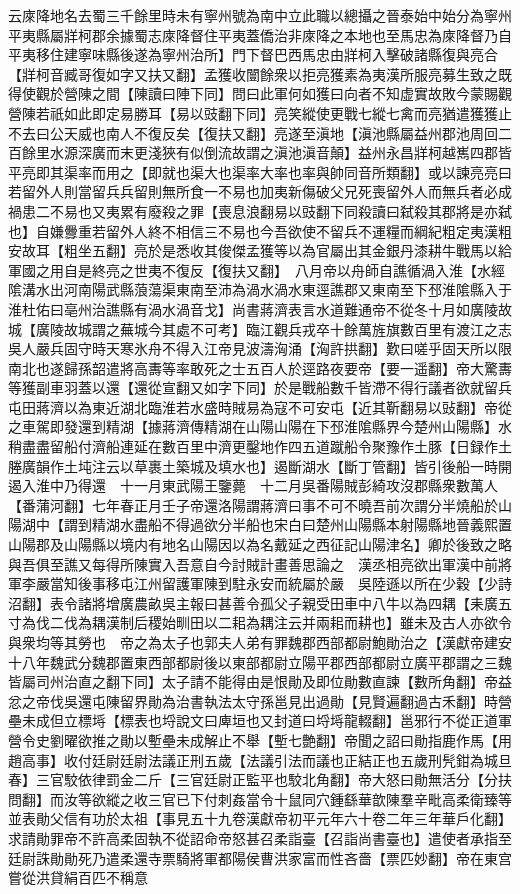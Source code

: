 云庲降地名去蜀三千餘里時未有寧州號為南中立此職以總攝之晉泰始中始分為寧州平夷縣屬牂柯郡余據蜀志庲降督住平夷蓋僑治非庲降之本地也至馬忠為庲降督乃自平夷移住建寧味縣後遂為寧州治所】門下督巴西馬忠由牂柯入擊破諸縣復與亮合【牂柯音臧哥復如字又扶又翻】孟獲收闓餘衆以拒亮獲素為夷漢所服亮募生致之既得使觀於營陳之間【陳讀曰陣下同】問曰此軍何如獲曰向者不知虚實故敗今蒙賜觀營陳若祇如此即定易勝耳【易以豉翻下同】亮笑縱使更戰七縱七禽而亮猶遣獲獲止不去曰公天威也南人不復反矣【復扶又翻】亮遂至滇地【滇池縣屬益州郡池周回二百餘里水源深廣而末更淺狹有似倒流故謂之滇池滇音顛】益州永昌牂柯越嶲四郡皆平亮即其渠率而用之【即就也渠大也渠率大率也率與帥同音所類翻】或以諫亮亮曰若留外人則當留兵兵留則無所食一不易也加夷新傷破父兄死喪留外人而無兵者必成禍患二不易也又夷累有廢殺之罪【喪息浪翻易以豉翻下同殺讀曰弑殺其郡將是亦弑也】自嫌釁重若留外人終不相信三不易也今吾欲使不留兵不運糧而綱紀粗定夷漢粗安故耳【粗坐五翻】亮於是悉收其俊傑孟獲等以為官屬出其金銀丹漆耕牛戰馬以給軍國之用自是終亮之世夷不復反【復扶又翻】　八月帝以舟師自譙循渦入淮【水經隂溝水出河南陽武縣蒗蕩渠東南至沛為渦水渦水東逕譙郡又東南至下邳淮隂縣入于淮杜佑曰亳州治譙縣有渦水渦音戈】尚書蔣濟表言水道難通帝不從冬十月如廣陵故城【廣陵故城謂之蕪城今其處不可考】臨江觀兵戎卒十餘萬旌旗數百里有渡江之志吳人嚴兵固守時天寒氷舟不得入江帝見波濤洶涌【洶許拱翻】歎曰嗟乎固天所以限南北也遂歸孫韶遣將高夀等率敢死之士五百人於逕路夜要帝【要一遥翻】帝大驚夀等獲副車羽蓋以還【還從宣翻又如字下同】於是戰船數千皆滯不得行議者欲就留兵屯田蔣濟以為東近湖北臨淮若水盛時賊易為寇不可安屯【近其靳翻易以䜴翻】帝從之車駕即發還到精湖【據蔣濟傳精湖在山陽山陽在下邳淮隂縣界今楚州山陽縣】水稍盡盡留船付濟船連延在數百里中濟更鑿地作四五道蹴船令聚豫作土豚【日録作土塍廣韻作土坉注云以草裹土築城及填水也】遏斷湖水【斷丁管翻】皆引後船一時開遏入淮中乃得還　十一月東武陽王鑒薨　十二月吳番陽賊彭綺攻沒郡縣衆數萬人【番蒲河翻】七年春正月壬子帝還洛陽謂蔣濟曰事不可不曉吾前次謂分半燒船於山陽湖中【謂到精湖水盡船不得過欲分半船也宋白曰楚州山陽縣本射陽縣地晉義熙置山陽郡及山陽縣以境内有地名山陽因以為名戴延之西征記山陽津名】卿於後致之略與吾俱至譙又每得所陳實入吾意自今討賊計畫善思論之　漢丞相亮欲出軍漢中前將軍李嚴當知後事移屯江州留護軍陳到駐永安而統屬於嚴　吳陸遜以所在少穀【少詩沼翻】表令諸將增廣農畝吳主報曰甚善令孤父子親受田車中八牛以為四耦【耒廣五寸為伐二伐為耦漢制后稷始甽田以二耜為耦注云并兩耜而耕也】雖未及古人亦欲令與衆均等其勞也　帝之為太子也郭夫人弟有罪魏郡西部都尉鮑勛治之【漢獻帝建安十八年魏武分魏郡置東西部都尉後以東部都尉立陽平郡西部都尉立廣平郡謂之三魏皆屬司州治直之翻下同】太子請不能得由是恨勛及即位勛數直諫【數所角翻】帝益忿之帝伐吳還屯陳留界勛為治書執法太守孫邕見出過勛【見賢遍翻過古禾翻】時營壘未成但立標埓【標表也埒說文曰庳垣也又封道曰埒埓龍輟翻】邕邪行不從正道軍營令史劉曜欲推之勛以塹壘未成解止不舉【塹七艶翻】帝聞之詔曰勛指鹿作馬【用趙高事】收付廷尉廷尉法議正刑五歲【法議引法而議也正結正也五歲刑髠鉗為城旦春】三官駮依律罰金二斤【三官廷尉正監平也駮北角翻】帝大怒曰勛無活分【分扶問翻】而汝等欲縱之收三官已下付刺姦當令十鼠同穴鍾繇華歆陳羣辛毗高柔衛臻等並表勛父信有功於太祖【事見五十九卷漢獻帝初平元年六十卷二年三年華戶化翻】求請勛罪帝不許高柔固執不從詔命帝怒甚召柔詣臺【召詣尚書臺也】遣使者承指至廷尉誅勛勛死乃遣柔還寺票騎將軍都陽侯曹洪家富而性吝嗇【票匹妙翻】帝在東宫嘗從洪貸絹百匹不稱意